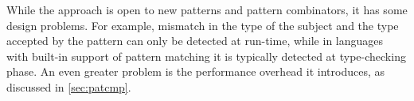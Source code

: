 While the approach is open to new patterns and pattern combinators, it has 
some design problems. For example, mismatch in the type of the subject and the 
type accepted by the pattern can only be detected at run-time, while in 
languages with built-in support of pattern matching it is typically detected at 
type-checking phase. An even greater problem is the performance overhead it 
introduces, as discussed in \textsection\ref{sec:patcmp}.



